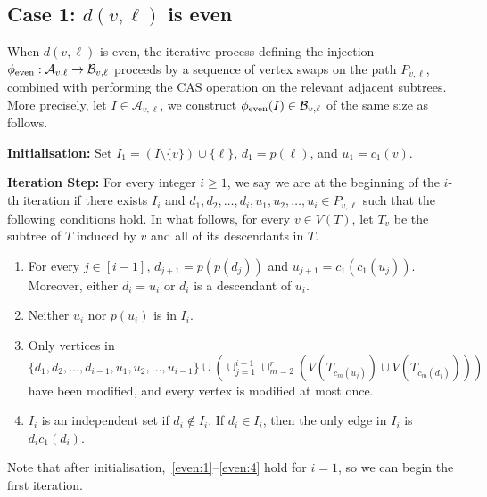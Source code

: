 \documentclass[11pt]{article}
\theoremstyle{definition}
\newcounter{propcounter}
\begin{document}
\subsection{Case 1: $d(v,\ell)$ is even}\label{sec:even}
When $d(v, \ell)$ is even, the iterative process defining the injection $\phi_{\textup{even}}:\mathcal{A}_{v,\ell}\to\mathcal{B}_{v,\ell}$ %
proceeds by a sequence of vertex swaps on the path $P_{v,\ell}$, combined with performing the CAS operation on the relevant adjacent subtrees. More precisely, let $I\in\mathcal{A}_{v,\ell}$, we construct $\phi_{\textup{even}}(I)\in\mathcal{B}_{v,\ell}$ of the same size as follows. 

\medskip

\noindent\textbf{Initialisation:} Set $I_1=(I\setminus\{v\})\cup\{\ell\}$, $d_1=p(\ell)$, and $u_1=c_1(v)$. 

\medskip

\noindent\textbf{Iteration Step:} For every integer $i\geq 1$, we say we are at the beginning of the $i$-th iteration if there exists $I_i$ and $d_1,d_2,\ldots,d_i,u_1,u_2,\ldots,u_i\in P_{v,\ell}$ such that the following conditions hold. In what follows, for every $v\in V(T)$, let $T_v$ be the subtree of $T$ induced by $v$ and all of its descendants in $T$. 
\begin{enumerate}[label = \textbf{\Alph{propcounter}\arabic{enumi}}]
    \item\label{even:1} For every $j\in[i-1]$, $d_{j+1}=p(p(d_j))$ and $u_{j+1}=c_1(c_1(u_j))$. Moreover, either $d_i=u_i$ or $d_i$ is a descendant of $u_i$. 
    \item\label{even:2} Neither $u_i$ nor $p(u_i)$ is in $I_i$. 
    \item\label{even:3} Only vertices in $\{d_1,d_2,\ldots,d_{i-1},u_1,u_2,\ldots,u_{i-1}\}\cup(\cup_{j=1}^{i-1}\cup_{m=2}^r(V(T_{c_m(u_j)})\cup V(T_{c_m(d_j)})))$ have been modified, and every vertex is modified at most once.
    \item\label{even:4} $I_i$ is an independent set if $d_i\not\in I_i$. If $d_i\in I_i$, then the only edge in $I_i$ is $d_ic_1(d_i)$.
\end{enumerate}
Note that after initialisation,~\ref{even:1}--\ref{even:4} hold for $i=1$, so we can begin the first iteration. 
\end{document}

